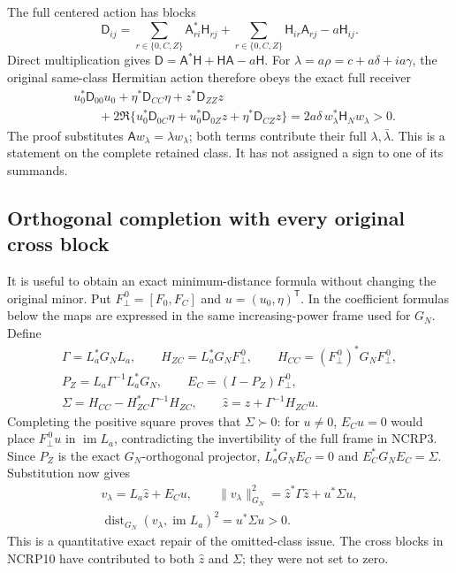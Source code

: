 The full centered action has blocks
\[
 \mathsf D_{ij}
 =\sum_{r\in\{0,C,Z\}}\mathsf A_{ri}^*\mathsf H_{rj}
  +\sum_{r\in\{0,C,Z\}}\mathsf H_{ir}\mathsf A_{rj}
  -a\mathsf H_{ij}.
 \tag{NCRP11}
\]
Direct multiplication gives
$\mathsf D=\mathsf A^*\mathsf H+\mathsf H\mathsf A-a\mathsf H$.
For $\lambda=a\rho=c+a\delta+ia\gamma$, the original same-class
Hermitian action therefore obeys the exact full receiver
\[
 \begin{split}
 &u_0^*\mathsf D_{00}u_0+\eta^*\mathsf D_{CC}\eta
       +z^*\mathsf D_{ZZ}z\\
 &\qquad+
 2\Re\{u_0^*\mathsf D_{0C}\eta+
                  u_0^*\mathsf D_{0Z}z+
                  \eta^*\mathsf D_{CZ}z\}
       =2a\delta\, w_\lambda^*\mathsf H_Nw_\lambda>0.
 \end{split}                                                     \tag{NCRP12}
\]
The proof substitutes $\mathsf Aw_\lambda=\lambda w_\lambda$;
both terms contribute their full $\lambda,\bar\lambda$.
This is a statement on the complete retained class. It has not
assigned a sign to one of its summands.

\subsection{Orthogonal completion with every original cross block}

It is useful to obtain an exact minimum-distance formula without
changing the original minor. Put
$F_\perp^{\,0}=[F_0,F_C]$ and $u=(u_0,\eta)^{\mathsf T}$.
In the coefficient formulas below the maps are expressed in the
same increasing-power frame used for $G_N$. Define
\[
 \begin{gathered}
 \Gamma=L_a^*G_NL_a,\qquad
 H_{ZC}=L_a^*G_NF_\perp^{\,0},\qquad
 H_{CC}=(F_\perp^{\,0})^*G_NF_\perp^{\,0},\\
 P_Z=L_a\Gamma^{-1}L_a^*G_N,\qquad
 E_C=(I-P_Z)F_\perp^{\,0},\\
 \Sigma=H_{CC}-H_{ZC}^*\Gamma^{-1}H_{ZC},\qquad
 \widehat z=z+\Gamma^{-1}H_{ZC}u .
 \end{gathered}                                                   \tag{NCRP13}
\]
Completing the positive square proves that $\Sigma\succ0$:
for $u\ne0$, $E_Cu=0$ would place $F_\perp^{\,0}u$ in
$\operatorname{im}L_a$, contradicting the invertibility of
the full frame in NCRP3. Since $P_Z$ is the exact $G_N$-orthogonal
projector, $L_a^*G_NE_C=0$ and $E_C^*G_NE_C=\Sigma$.
Substitution now gives
\[
 \begin{gathered}
 v_\lambda=L_a\widehat z+E_Cu,\qquad
 \|v_\lambda\|_{G_N}^2
       =\widehat z^*\Gamma\widehat z+u^*\Sigma u,\\
 \operatorname{dist}_{G_N}(v_\lambda,\operatorname{im}L_a)^2
       =u^*\Sigma u>0.
 \end{gathered}                                                   \tag{NCRP14}
\]
This is a quantitative exact repair of the omitted-class issue.
The cross blocks in NCRP10 have contributed to both $\widehat z$
and $\Sigma$; they were not set to zero.


